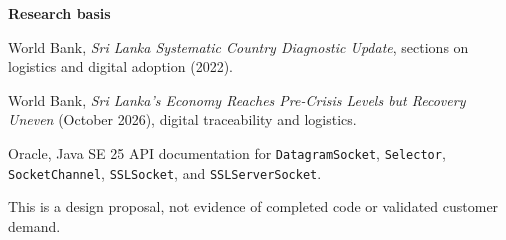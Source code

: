 \documentclass[10pt,a4paper]{article}
\begin{document}
\vspace{0mm}
{\footnotesize\color{grey}\textbf{Research basis}\par
[1] World Bank, \emph{Sri Lanka Systematic Country Diagnostic Update}, sections on logistics and digital adoption (2022).\par
[2] World Bank, \emph{Sri Lanka's Economy Reaches Pre-Crisis Levels but Recovery Uneven} (October 2026), digital traceability and logistics.\par
[3] Oracle, Java SE 25 API documentation for \texttt{DatagramSocket}, \texttt{Selector}, \texttt{SocketChannel}, \texttt{SSLSocket}, and \texttt{SSLServerSocket}.\par
This is a design proposal, not evidence of completed code or validated customer demand.}
\normalsize
\end{document}
